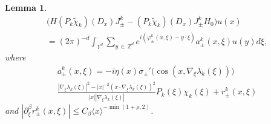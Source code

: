 \documentclass[10pt]{amsart}
\newtheorem{lemm}[theo]{Lemma}
\theoremstyle{definition}
\numberwithin{equation}{section}
\renewcommand{\b}{\beta}
\newcommand{\f}{\varphi}
\renewcommand{\l}{\lambda}
\newcommand{\x}{\xi}
\newcommand{\y}{\eta}
\newcommand{\s}{\sigma}
\newcommand{\Z}{\mathbb{Z}}
\newcommand{\T}{\mathbb{T}}
\newcommand{\la}{\langle}
\newcommand{\ra}{\rangle}
\begin{document}
\begin{lemm}\label{HJ-JH_0 lem}
\begin{multline*}
\bigl(H (P_k \tilde\chi_k)(D_x)J_\pm^k - (P_k \tilde\chi_k)(D_x)J_\pm^k H_0\bigr)u(x)\\
= (2\pi)^{-d}\int_{\T^d}\sum_{y\,\in\,\Z^d}e^{i\left(\f_\pm^k(x,\x)-y\cdot\xi\right)}a_\pm^k(x,\xi)u(y)d\xi,
\end{multline*}
where
\begin{multline}\label{s_a def}
a_\pm^k(x,\x)
= - i \y(x)\s_\pm'\bigl(\cos(x,\nabla_\x \l_k(\x))\bigr) \\
\frac{|\nabla_\x \l_k(\x)|^2 - |x|^{-2} (x\cdot\nabla_\x \l_k(\x))^2}{|x| |\nabla_\x \l_k(\x)|} P_k(\x) \chi_k(\x) 
 + r_\pm^k(x,\x) 
\end{multline}
and $|\partial_\x^\b r_\pm^k(x,\x)| \leq C_\b \la x \ra^{-\min(1+\rho,2)}$.
\end{lemm}
\end{document}
